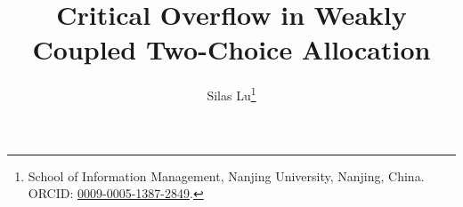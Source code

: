 \usepackage{amsfonts,amssymb,graphicx,booktabs,array,microtype,xurl}
\usepackage{placeins,needspace,enumitem}
\setlength{\emergencystretch}{1em}
\modulolinenumbers[5]
\newcommand{\creflastconjunction}{, and~}
\newcommand{\E}{\mathbb E}
\newcommand{\Prob}{\mathbb P}
\newcommand{\R}{\mathbb R}
\newcommand{\Z}{\mathbb Z}
\newcommand{\one}{\mathbf 1}
\newcommand{\W}{W_1}
\newcommand{\eps}{\varepsilon}
\newcommand{\gb}{\overline g}
\newcommand{\TV}{\operatorname{TV}}
\newcommand{\cL}{\mathcal L}
\newcommand{\sh}{\mathsf S}
\newcommand{\dd}{\,\mathrm d}
\newcommand{\norm}[1]{\left\lVert#1\right\rVert}
\DeclareMathOperator{\diag}{diag}
\title{Critical Overflow in Weakly Coupled Two-Choice Allocation}
\author{Silas Lu\thanks{School of Information Management, Nanjing University,
Nanjing, China. ORCID: \href{https://orcid.org/0009-0005-1387-2849}{0009-0005-1387-2849}.}}
